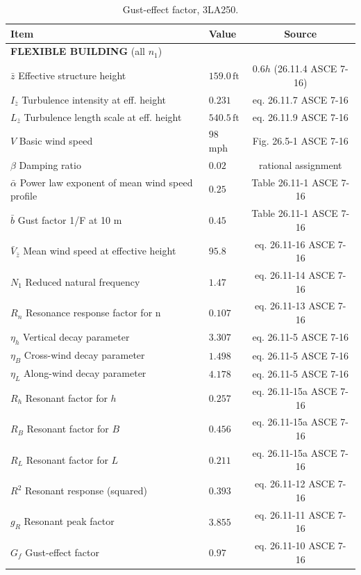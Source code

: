 \documentclass[onecolumn, fleqn]{article}
\newcommand{\ft}{\ensuremath{\,\mathrm{ft}}}
\begin{document}
\begin{table}[H]
\centering \caption{Gust-effect factor, 3LA250.}
\label{tab:gust_factor_20SE250}
\begin{tabular}{llc}
\toprule
Item		& Value		& Source		\\
\midrule
\multicolumn{3}{l}{\textbf{FLEXIBLE BUILDING} (all $n_1$)}	\\
$\bar{z}$ Effective structure height							& $159.0 \ft$					& $0.6h$ (26.11.4 ASCE 7-16)	\\
$I_{\bar{z}}$ Turbulence intensity at eff. height				& $0.231$						& eq. 26.11.7 ASCE 7-16			\\
$L_{\bar{z}}$ Turbulence length scale at eff. height			& $540.5 \ft$					& eq. 26.11.9 ASCE 7-16			\\
$V$ Basic wind speed											& $98$ mph						& Fig. 26.5-1 ASCE 7-16			\\
$\beta$ Damping ratio											& $0.02$						& rational assignment			\\
$\bar{\alpha}$ Power law exponent of mean wind speed profile	& $0.25$						& Table 26.11-1 ASCE 7-16		\\
$\bar{b}$ Gust factor 1/F at 10 m								& $0.45$						& Table 26.11-1 ASCE 7-16		\\
$\bar{V}_{\bar{z}}$ Mean wind speed at effective height			& $95.8$						& eq. 26.11-16 ASCE 7-16		\\
$N_1$ Reduced natural frequency									& $1.47$						& eq. 26.11-14 ASCE 7-16		\\
$R_n$ Resonance response factor for n							& $0.107$						& eq. 26.11-13 ASCE 7-16		\\
$\eta_h$ Vertical decay parameter								& $3.307$						& eq. 26.11-5 ASCE 7-16			\\
$\eta_B$ Cross-wind decay parameter								& $1.498$						& eq. 26.11-5 ASCE 7-16			\\
$\eta_L$ Along-wind decay parameter								& $4.178$						& eq. 26.11-5 ASCE 7-16			\\
$R_h$ Resonant factor for $h$									& $0.257$							& eq. 26.11-15a ASCE 7-16			\\
$R_B$ Resonant factor for $B$									& $0.456$							& eq. 26.11-15a ASCE 7-16			\\
$R_L$ Resonant factor for $L$									& $0.211$							& eq. 26.11-15a ASCE 7-16			\\
$R^2$ Resonant response (squared)								& $0.393$							& eq. 26.11-12 ASCE 7-16			\\
$g_R$ Resonant peak factor										& $3.855$							& eq. 26.11-11 ASCE 7-16			\\
$G_f$ Gust-effect factor										& $0.97$							& eq. 26.11-10 ASCE 7-16			\\
\bottomrule
\end{tabular}
\end{table}
\end{document}
